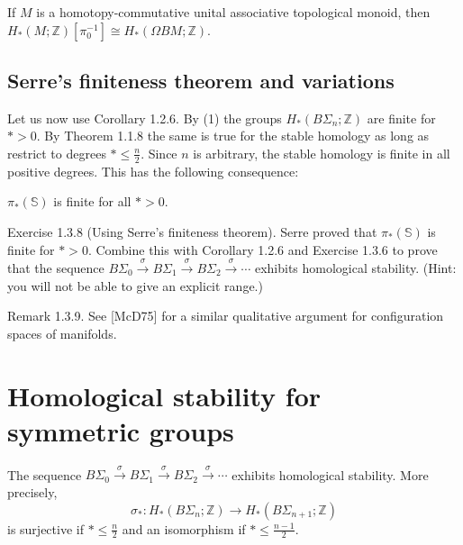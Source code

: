 \begin{theo}
     If $M$ is a homotopy-commutative unital associative topological monoid, then $H_*(M ; \mathbb{Z})\left[\pi_0^{-1}\right] \cong H_*(\Omega B M ; \mathbb{Z})$.    
\end{theo}


\section{Serre's finiteness theorem and variations}

Let us now use Corollary 1.2.6. By (1) the groups $H_*\left(B \Sigma_n ; \mathbb{Z}\right)$ are finite for $*>0$. By Theorem 1.1.8 the same is true for the stable homology as long as restrict to degrees $* \leq \frac{n}{2}$. Since $n$ is arbitrary, the stable homology is finite in all positive degrees. This has the following consequence:

\begin{theo}
$\pi_*(\mathbb{S})$ is finite for all $*>0$.
\end{theo}


Exercise 1.3.8 (Using Serre's finiteness theorem). Serre proved that $\pi_*(\mathbb{S})$ is finite for $*>0$. Combine this with Corollary 1.2.6 and Exercise 1.3.6 to prove that the sequence $B \Sigma_0 \xrightarrow{\sigma} B \Sigma_1 \xrightarrow{\sigma} B \Sigma_2 \xrightarrow{\sigma} \cdots$ exhibits homological stability. (Hint: you will not be able to give an explicit range.)

Remark 1.3.9. See [McD75] for a similar qualitative argument for configuration spaces of manifolds.


\chapter{Homological stability for symmetric groups}

\begin{theo}
The sequence $B \Sigma_0 \xrightarrow{\sigma} B \Sigma_1 \xrightarrow{\sigma} B \Sigma_2 \xrightarrow{\sigma} \cdots$ exhibits homological stability. More precisely,
$$
\sigma_*: H_*\left(B \Sigma_n ; \mathbb{Z}\right) \longrightarrow H_*\left(B \Sigma_{n+1} ; \mathbb{Z}\right)
$$
is surjective if $* \leq \frac{n}{2}$ and an isomorphism if $* \leq \frac{n-1}{2}$.
\end{theo}




